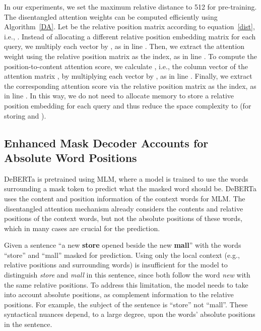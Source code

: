\documentclass{article}
\def\eqref#1{equation~\ref{#1}}
\begin{document}
In our experiments, we set the maximum relative distance  to 512 for pre-training.
The disentangled attention weights can be computed efficiently using Algorithm~\ref{DA}.
Let  be the relative position matrix according to \eqref{dist}, i.e., .
Instead of allocating a different relative position embedding matrix for each query, we multiply each  vector  by , as in line . 
Then, we extract the attention weight using the relative position matrix  as the index, as in line . 
To compute the position-to-content attention score, we  calculate , i.e., the column vector of the attention matrix , by multiplying each  vector  by , as in line . 
Finally, we extract the corresponding attention score via the relative position matrix  as the index, as in line . 
In this way, we do not need to allocate memory to store a relative position embedding for each query and thus reduce the space complexity to  (for storing  and ). 












\subsection{Enhanced Mask Decoder Accounts for Absolute Word Positions}
\label{EMD}


DeBERTa is pretrained using MLM, where a model is trained to use the words surrounding a mask token to predict what the masked word should be. 
DeBERTa uses the content and position information of the context words for MLM. The disentangled attention mechanism already considers the contents and relative positions of the context words, but not the absolute positions of these words, which in many cases are crucial for the prediction.

Given a sentence ``a new \textbf{store} opened beside the new \textbf{mall}'' with the words ``store'' and ``mall'' masked for prediction. Using only the local context (e.g., relative positions and surrounding words) is insufficient for the model to distinguish \textit{store} and \textit{mall} in this sentence, since both follow the word \textit{new} with the same relative positions. 
To address this limitation, the model needs to take into account absolute positions, as complement information to the relative positions. 
For example, the subject of the sentence is “store” not “mall”. These syntactical nuances depend, to a large degree, upon the words’ absolute positions in the sentence.
\end{document}
